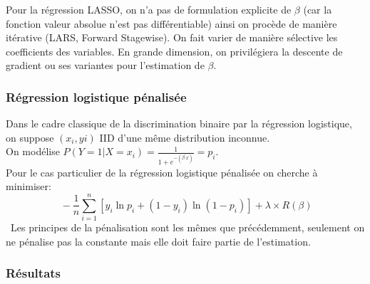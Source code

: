 \documentclass[french]{article}
\begin{document}
\begin{multicols}{2}
Pour la régression LASSO, on n'a pas de formulation explicite de $\beta$ (car la fonction valeur absolue n'est pas différentiable) ainsi on procède de manière itérative (LARS, Forward Stagewise). On fait varier de manière sélective les coefficients des variables. En grande dimension, on privilégiera la descente de gradient ou ses variantes pour l'estimation de $\beta$.\\
\subsubsection{Régression logistique pénalisée}
Dans le cadre classique de la discrimination binaire par la régression logistique, on suppose $(x_i,yi)$ IID d'une même distribution inconnue.\\
On modélise $P(Y=1|X=x_i)=\frac{1}{1+e^{-\left(\beta^{\prime} x\right)}}=p_i$.\\
Pour le cas particulier de la régression logistique pénalisée on cherche à minimiser:
\[\ -\frac{1}{n} \sum_{i=1}^{n} \left[y_{i} \ln p_{i}+\left(1-y_{i}\right) \ln \left(1-p_{i}\right)\right] +\lambda \times R(\beta) \]\
Les principes de la pénalisation sont les mêmes que précédemment, seulement on ne pénalise pas la constante mais elle doit faire partie de l'estimation.\\


\subsubsection{Résultats}


\end{multicols}
\end{document}
